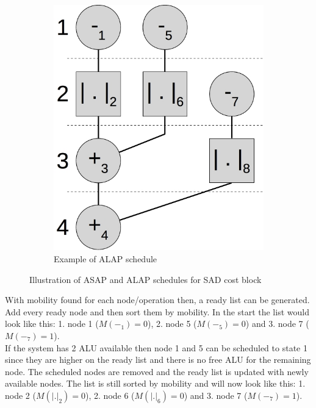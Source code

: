 \begin{figure}[ht]
\begin{subfigure}[t]{0.45\textwidth}
    \centering\includegraphics[scale=0.4]{figures/csadalap.jpg}
    \caption{Example of ALAP schedule\label{fig:sch_alap}}
  \end{subfigure}
  \caption{Illustration of ASAP and ALAP schedules for SAD cost block \label{fig:sch_asap_alap}}
\end{figure}

With mobility found for each node/operation then, a ready list can be generated. Add every ready node and then sort them by mobility. In the start the list would look like this: 1. node 1 ($M(-_1)=0$), 2. node 5 ($M(-_5)=0$) and 3. node 7 ($M(-_7)=1$).\\

If the system has 2 ALU available then node 1 and 5 can be scheduled to state 1 since they are higher on the ready list and there is no free ALU for the remaining node. The scheduled nodes are removed and the ready list is updated with newly available nodes. The list is still sorted by mobility and will now look like this: 1. node 2 ($M(|.|_2)=0$), 2. node 6 ($M(|.|_6)=0$) and 3. node 7 ($M(-_7)=1$). \\


